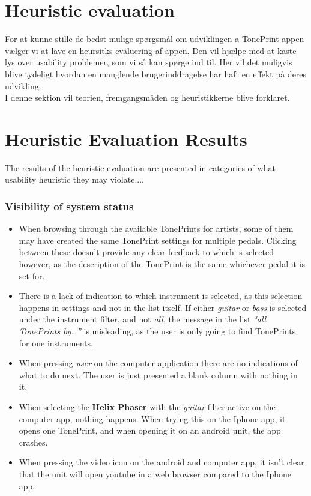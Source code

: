 \section{Heuristic evaluation}
\label{SectionHeuristicEvaluation}
For at kunne stille de bedst mulige spørgsmål om udviklingen a TonePrint appen vælger vi at lave en heursitks evaluering af appen. Den vil hjælpe med at kaste lys over usability problemer, som vi så kan spørge ind til. Her vil det muligvis blive tydeligt hvordan en manglende brugerinddragelse har haft en effekt på deres udvikling. \\
I denne sektion vil teorien, fremgangsmåden og heuristikkerne blive forklaret.

\section{Heuristic Evaluation Results}
\label{Heuristic_Results}
The results of the heuristic evaluation are presented in categories of what usability heuristic they may violate....

\subsubsection{Visibility of system status}
\begin{itemize}
	\item When browsing through the available TonePrints for artists, some of them may have created the same TonePrint settings for multiple pedals. Clicking between these doesn’t provide any clear feedback to which is selected however, as the description of the TonePrint is the same whichever pedal it is set for.\\
	\item There is a lack of indication to which instrument is selected, as this selection happens in settings and not in the list itself. If either \textit{guitar} or \textit{bass} is selected under the instrument filter, and not \textit{all}, the message in the list \textit{"all TonePrints by…”} is misleading, as the user is only going to find TonePrints for one instruments.\\
	\item When pressing \textit{user} on the computer application there are no indications of what to do next. The user is just presented a blank column with nothing in it.\\
	\item When selecting the \textbf{Helix Phaser} with the \textit{guitar} filter active on the computer app, nothing happens. When trying this on the Iphone app, it opens one TonePrint, and when opening it on an android unit, the app crashes.\\
	\item When pressing the video icon on the android and computer app, it isn't clear that the unit will open youtube in a web browser compared to the Iphone app.
\end{itemize}
%
